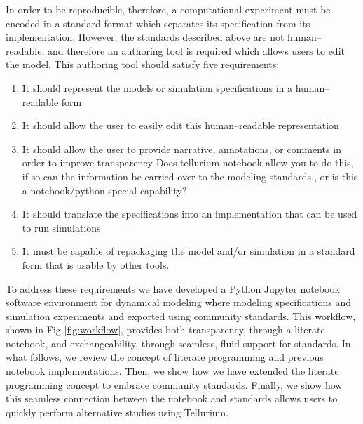 \documentclass[10pt,letterpaper]{article}
\begin{document}
In order to be reproducible, therefore, a computational experiment must be encoded in a standard format which separates its specification from its implementation. However, the standards described above are not human--readable, and therefore an authoring tool is required which allows users to edit the model. This authoring tool should satisfy five requirements:
%
%
\begin{enumerate}
\item It should represent the models or simulation specifications in a human--readable form
\item It should allow the user to easily edit this human--readable representation
\item It should allow the user to provide narrative, annotations, or comments in order to improve transparency {\color{red} Does tellurium notebook allow you to do this, if so can the information be carried over to the modeling standards., or is this a notebook/python special capability?}
\item It should translate the specifications into an implementation that can be used to run simulations
\item It must be capable of repackaging the model and/or simulation in a standard form that is usable by other tools.
\end{enumerate}

To address these requirements we have developed a Python Jupyter notebook software environment for dynamical modeling where modeling specifications and simulation experiments and exported using community standards. This workflow, shown in Fig \ref{fig:workflow}, provides both transparency, through a literate notebook, and exchangeability, through seamless, fluid support for standards. In what follows, we review the concept of literate programming and previous notebook implementations. Then, we show how we have extended the literate programming concept to embrace community standards. Finally, we show how this seamless connection between the notebook and standards allows users to quickly perform alternative studies using Tellurium.
\end{document}
